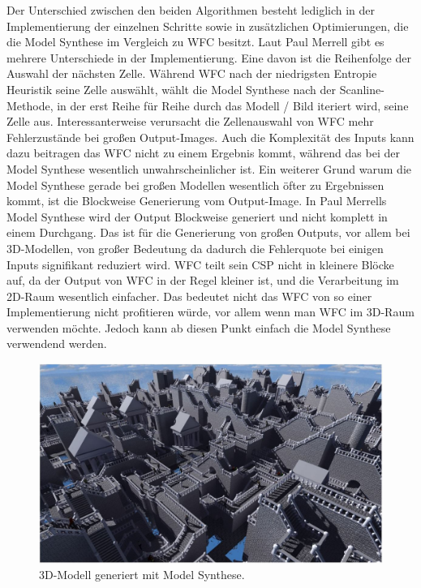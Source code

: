 \documentclass[12pt, a4paper,twoside,openright]{report}
\begin{document}
Der Unterschied zwischen den beiden Algorithmen besteht lediglich in der Implementierung der einzelnen Schritte sowie in zusätzlichen Optimierungen,
die die Model Synthese im Vergleich zu WFC besitzt.
Laut Paul Merrell gibt es mehrere Unterschiede in der Implementierung.
\newline
Eine davon ist die Reihenfolge der Auswahl der nächsten Zelle.
Während WFC nach der niedrigsten Entropie Heuristik seine Zelle auswählt,
wählt die Model Synthese nach der Scanline-Methode, in der erst Reihe für Reihe durch das Modell / Bild iteriert wird, seine Zelle aus.
Interessanterweise verursacht die Zellenauswahl von WFC mehr Fehlerzustände bei großen Output-Images.
Auch die Komplexität des Inputs kann dazu beitragen das WFC nicht zu einem Ergebnis kommt, während das bei der Model Synthese wesentlich unwahrscheinlicher ist.
\newline
Ein weiterer Grund warum die Model Synthese gerade bei großen Modellen wesentlich öfter zu Ergebnissen kommt, ist die Blockweise Generierung vom Output-Image.
In Paul Merrells Model Synthese wird der Output Blockweise generiert und nicht komplett in einem Durchgang.
Das ist für die Generierung von großen Outputs, vor allem bei 3D-Modellen, von großer Bedeutung da dadurch die Fehlerquote bei einigen Inputs signifikant reduziert wird.
WFC teilt sein CSP nicht in kleinere Blöcke auf, da der Output von WFC in der Regel kleiner ist, und die Verarbeitung im 2D-Raum wesentlich einfacher.
Das bedeutet nicht das WFC von so einer Implementierung nicht profitieren würde, vor allem wenn man WFC im 3D-Raum verwenden möchte.
Jedoch kann ab diesen Punkt einfach die Model Synthese verwendend werden. \cite{merrell2018compare}

\begin{figure}[H]
    \centering
    \includegraphics[width=1\linewidth]{images/3D-model-synthese.JPG}%
    \caption{3D-Modell generiert mit Model Synthese.}%
\end{figure}
\end{document}
